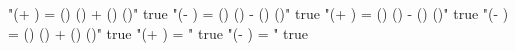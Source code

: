 "\sin(\alpha + \beta) = \sin(\alpha) \cos(\beta) + \cos(\alpha) \sin(\beta)" true
"\sin(\alpha - \beta) = \sin(\alpha) \cos(\beta) - \cos(\alpha) \sin(\beta)" true
"\cos(\alpha + \beta) = \cos(\alpha) \cos(\beta) - \sin(\alpha) \sin(\beta)" true
"\cos(\alpha - \beta) = \cos(\alpha) \cos(\beta) + \sin(\alpha) \sin(\beta)" true
"\tan(\alpha + \beta) = " true
"\tan(\alpha - \beta) = " true
